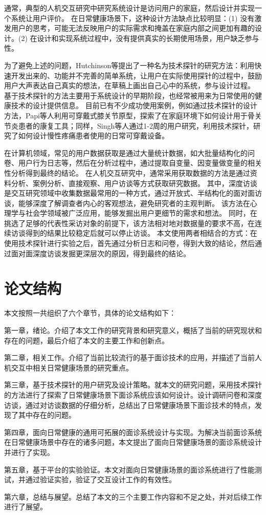 通常，典型的人机交互研究中研究系统设计是访问用户的家庭，然后设计并实现一个系统让用户评价。
在日常健康场景下，这种设计方法缺点比较明显\cite{Hutchinson2003Technology}：(1) 没有激发用户的思考，可能无法反映用户的实际需求和掩盖在家庭内部之间更加有趣的设计。(2) 在设计和实现系统过程中，没有提供真实的长期使用场景，用户缺乏参与性。


为了避免上述的问题，Hutchinson等\cite{Hutchinson2003Technology}提出了一种名为技术探针的研究方法：利用快速开发出来的、功能并不完善的简单系统，让用户在实际使用探针的过程中，鼓励用户大声表达自己真实的想法，在草稿上画出自己心中的系统，参与设计过程。
基于技术探针的方法主要用于系统设计的早期阶段\cite{turmo2020training}，也经常被用来为日常使用的健康技术的设计提供信息。
目前已有不少成功使用案例，例如通过技术探针的设计方法，Papi等人\cite{papi2015knee}利用可穿戴式膝关节原型，探索了在家庭环境下如何设计用于骨关节炎患者的康复工具；同样，Singh等人\cite{singh2017supporting}通过1-2周的用户研究，利用技术探针，研究了如何设计慢性疼痛患者使用的日常可穿戴设备。

在计算机领域，常见的用户数据获取是通过大量统计数据，如大批量结构化的问卷、用户行为日志等，然后在分析过程中，通过提取自变量、因变量做变量的相关性分析得到最终的结论。
在人机交互研究中，通常采用获取数据的方法是通过资料分析、案例分析、直接观察、用户访谈等方式获取研究数据。
其中，深度访谈是交互研究领域中收集数据最常用的一种方式，通过开放式、半结构化的面对面访谈，能够深度了解调查者内心的客观想法，避免研究者的主观判断。
该方法在心理学与社会学领域被广泛应用，能够发掘出用户更细节的需求和想法。
同时，在挑选了足够的代表性采访对象的前提下，该方法相对地对数据量的要求不高，在连续访谈得到的结果比较稳定后就可以停止访谈\cite{cleary2014data}。
本文使用两者相结合的方式：在使用技术探针进行实验之后，首先通过分析日志和问卷，得到大致的结论，然后通过面对面深度访谈发掘更深层次的原因，得到最终的结论。



\section{论文结构}
本文按照一共组织了六个章节，具体的论文结构如下：

第一章，绪论。介绍了本文工作的研究背景和研究意义，概括了当前的研究现状和存在的问题，最后介绍了本文的主要工作和创新点。

第二章，相关工作。介绍了当前比较流行的基于面诊技术的应用，并描述了当前人机交互中相关日常健康场景的研究重点。

第三章，基于技术探针的用户研究及设计策略。就本文的研究问题，采用技术探针的方法进行了探索了日常健康场景下面诊系统应该如何设计。设计调研问卷和深度访谈，通过对访谈数据的仔细分析，总结出了日常健康场景下面诊技术的特点，发现了其中存在的问题。

第四章，面向日常健康的通用可拓展的面诊系统设计与实现。为解决当前面诊系统在日常健康场景中存在的诸多问题，本文提出了面向日常健康场景的面诊系统设计并进行了实现。

第五章，基于平台的实验验证。本文对面向日常健康场景的面诊系统进行了性能测试，并通过验证实验，验证了交互设计工作的有效性。

第六章，总结与展望。总结了本文的三个主要工作内容和不足之处，并对后续工作进行了展望。